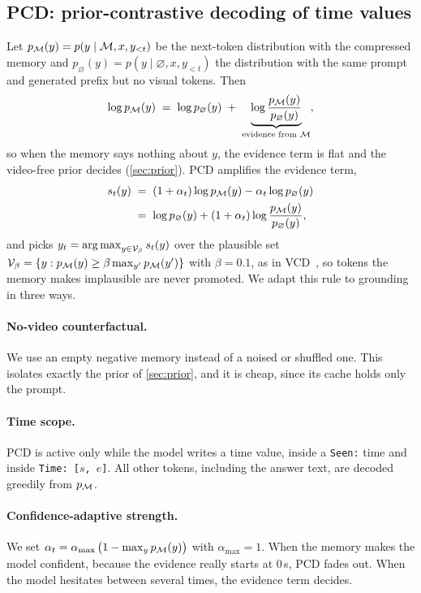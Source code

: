 \subsection{PCD: prior-contrastive decoding of time values}
\label{sec:contrast}

Let $p_{\mathcal{M}}(y) = p(y \mid \mathcal{M}, x, y_{<t})$ be the next-token distribution with the compressed memory and
$p_\varnothing(y) = p(y \mid \varnothing, x, y_{<t})$ the distribution with the same prompt and generated prefix but
no visual tokens. Then
\begin{equation}
  \log p_{\mathcal{M}}(y) \;=\; \log p_\varnothing(y) \;+\; \underbrace{\log \frac{p_{\mathcal{M}}(y)}{p_\varnothing(y)}}_{\text{evidence from } \mathcal{M}},
  \label{eq:decomp}
\end{equation}
so when the memory says nothing about $y$, the evidence term is flat and the video-free prior decides
(\cref{sec:prior}). PCD amplifies the evidence term,
\begin{equation}
\begin{aligned}
  s_t(y) &\;=\; (1+\alpha_t)\log p_{\mathcal{M}}(y) - \alpha_t \log p_\varnothing(y) \\
         &\;=\; \log p_\varnothing(y) + (1+\alpha_t) \log \frac{p_{\mathcal{M}}(y)}{p_\varnothing(y)},
\end{aligned}
  \label{eq:pcd}
\end{equation}
and picks $y_t = \operatorname*{arg\,max}_{y \in \mathcal{V}_\beta} s_t(y)$ over the plausible set
$\mathcal{V}_\beta = \{ y : p_{\mathcal{M}}(y) \geq \beta \max_{y'} p_{\mathcal{M}}(y') \}$ with $\beta{=}0.1$, as in VCD~\cite{vcd},
so tokens the memory makes implausible are never promoted. We adapt this rule to grounding in three ways.

\paragraph{No-video counterfactual.}
We use an empty negative memory instead of a noised or shuffled one. This isolates exactly the prior of
\cref{sec:prior}, and it is cheap, since its cache holds only the prompt.

\paragraph{Time scope.}
PCD is active only while the model writes a time value, inside a \texttt{Seen:} time and inside
\texttt{Time: [$s$, $e$]}. All other tokens, including the answer text, are decoded greedily from $p_{\mathcal{M}}$.

\paragraph{Confidence-adaptive strength.}
We set $\alpha_t = \alpha_{\max}\,\big(1 - \max_y p_{\mathcal{M}}(y)\big)$ with $\alpha_{\max}{=}1$. When the memory makes the
model confident, \eg because the evidence really starts at 0\,s, PCD fades out. When the model hesitates between
several times, the evidence term decides.

